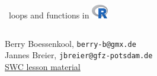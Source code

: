\documentclass[xcolor=table,      handout ,    xcolor=dvipsnames]{beamer}\usepackage[]{graphicx}\usepackage[]{color}
\begin{document}








{
\begin{frame}
\begin{center}
    \begin{columns}
    \column{15em}
    \begin{block}{}{\Large ~loops and functions in \includegraphics[width=0.7cm]{externalfig/Rlogo.png}}
    \end{block}
    \end{columns}
\vspace{1em}
Berry Boessenkool, \texttt{berry-b@gmx.de}\\
Jannes Breier, \texttt{jbreier@gfz-potsdam.de}\\[1em]
\href{https://gitext.gfz-potsdam.de/swc-bb/swc-lessons/2019-11-26-potsdam-berlin/R/tree/master/_episodes_rmd/data}{SWC lesson material}\\[1em]

\end{center}
\end{frame}}
\end{document}

